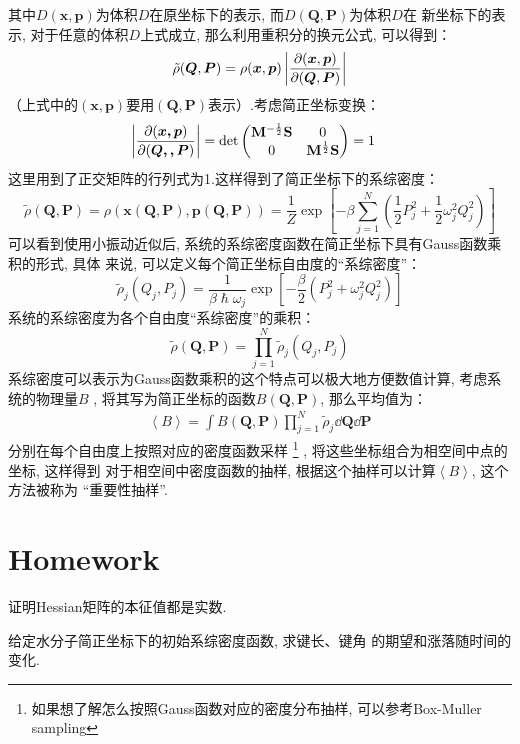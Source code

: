     其中$D(\bm{x},\bm{p})$为体积$D$在原坐标下的表示, 而$D(\bm{Q}, \bm{P})$为体积$D$在
    新坐标下的表示, 对于任意的体积$D$上式成立, 那么利用重积分的换元公式, 可以得到：
    \begin{equation}
        \tilde{\rho}(\bm{Q}, \bm{P}) = \rho(\bm{x}, \bm{p})\left|\frac{\partial{(\bm{x}, \bm{p})}}{\partial{(\bm{Q}, \bm{P})}}\right|
    \end{equation}
    （上式中的$(\bm{x}, \bm{p})$要用$(\bm{Q}, \bm{P})$表示）.考虑简正坐标变换：
    \begin{equation}
        \begin{aligned}
            \left|\frac {\partial (\bm{x,p})}{\partial (\bm{Q,,P})}\right| &= \det
            \begin{pmatrix}
                \mathbf{M}^{-\frac{1}{2}}\mathbf{S} & 0\\
                0 & \mathbf{M}^{\frac{1}{2}}\mathbf{S}
            \end{pmatrix}
            = 1
        \end{aligned}
    \end{equation}
    这里用到了正交矩阵的行列式为1.这样得到了简正坐标下的系综密度：
    \begin{equation}
        \tilde{\rho}(\bm{Q}, \bm{P}) = \rho(\bm{x}(\bm{Q}, \bm{P}), \bm{p}(\bm{Q}, \bm{P})) 
        = \frac{1}{Z}\exp\left[-\beta\sum_{j=1}^{N}\left(\frac{1}{2}P_{j}^{2} + \frac{1}{2}\omega_{j}^2 Q_{j}^{2}\right)\right] 
    \end{equation}
    可以看到使用小振动近似后, 系统的系综密度函数在简正坐标下具有Gauss函数乘积的形式, 具体
    来说, 可以定义每个简正坐标自由度的“系综密度”：
    \begin{equation}
        \tilde{\rho}_{j}(Q_j, P_j) = \frac {1}{\beta\hslash\omega_j} \exp\left[-\frac {\beta}2 (P_j^2 + \omega_j^2 Q_j^2)\right]
    \end{equation}
    系统的系综密度为各个自由度“系综密度”的乘积：
    \begin{equation}
        \tilde{\rho}(\bm{Q}, \bm{P}) = \prod_{j=1}^{N}\tilde{\rho}_{j}(Q_j, P_j)
    \end{equation}
    系综密度可以表示为Gauss函数乘积的这个特点可以极大地方便数值计算, 考虑系统的物理量$B$
    , 将其写为简正坐标的函数$B(\bm{Q}, \bm{P})$, 那么平均值为：
    \begin{equation}
        \begin{split}
            \left<B\right> = \int B(\bm{Q}, \bm{P})\prod_{j=1}^{N}\tilde{\rho}_j\dd \bm{Q}\dd \bm{P}
        \end{split}
    \end{equation}
    分别在每个自由度上按照对应的密度函数采样
    \footnote{
        如果想了解怎么按照Gauss函数对应的密度分布抽样, 可以参考Box-Muller sampling
    }
    , 将这些坐标组合为相空间中点的坐标, 这样得到
    对于相空间中密度函数的抽样, 根据这个抽样可以计算$\left<B\right>$, 这个方法被称为
    “重要性抽样”.
    \section{Homework}
    \begin{asg}
        证明Hessian矩阵的本征值都是实数.
    \end{asg}
    \begin{asg}
        给定水分子简正坐标下的初始系综密度函数, 求键长、键角
        的期望和涨落随时间的变化.
    \end{asg}


    
    
